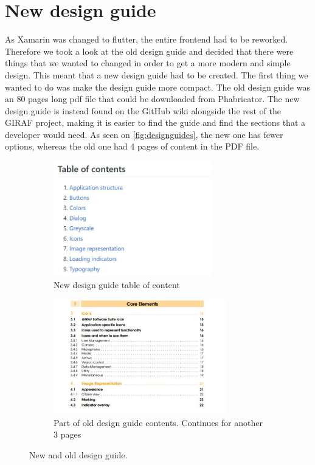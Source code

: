 \section{New design guide}
As Xamarin was changed to flutter, the entire frontend had to be reworked. 
Therefore we took a look at the old design guide and decided that there were things that we wanted to changed in order to get a more modern and simple design.
This meant that a new design guide had to be created.
The first thing we wanted to do was make the design guide more compact.
The old design guide was an 80 pages long pdf file that could be downloaded from Phabricator.
The new design guide is instead found on the GitHub wiki alongside the rest of the GIRAF project, making it is easier to find the guide and find the sections that a developer would need.
As seen on \autoref{fig:designguides}, the new one has fewer options, whereas the old one had 4 pages of content in the PDF file.
\begin{figure}[H]
    \begin{subfigure}{0.6\textwidth}
    \includegraphics[width=1\linewidth, height=5cm]{figures/table-of-content-designguide.JPG}
    \caption{New design guide table of content}
    \label{fig:new-designguide}
    \end{subfigure}
    \begin{subfigure}{0.6\textwidth}
        \includegraphics[width=1\linewidth, height=5cm]{figures/old-design-guide}
    \caption{Part of old design guide contents. Continues for another 3 pages}
    \label{fig:old-designguide}
    \end{subfigure} 
    \caption{New and old design guide.}
    \label{fig:designguides}
\end{figure} 

